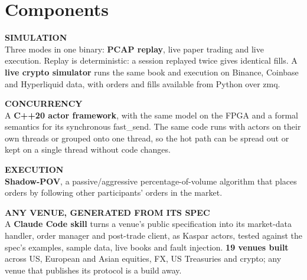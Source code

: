 \documentclass[10pt]{article}
\newcommand{\code}[1]{{\ttfamily\small #1}}
\newcommand{\tile}[2]{%
  {\color{ink3}\sffamily\bfseries\scriptsize\MakeUppercase{#1}}\\[1pt]
  \footnotesize #2\par\vspace{5pt}}
\begin{document}
\section{Components}
\vspace{2pt}

\noindent\begin{minipage}[t]{0.485\textwidth}

\tile{Simulation}{Three modes in one binary: \textbf{PCAP replay}, live
paper trading and live execution. Replay is deterministic: a session replayed
twice gives identical fills. A \textbf{live crypto simulator} runs the same
book and execution on Binance, Coinbase and Hyperliquid data, with orders and
fills available from Python over zmq.}

\tile{Concurrency}{A \textbf{C++20 actor framework}, with the same model on
the FPGA and a formal semantics for its synchronous \code{fast\_send}. The same code runs with actors on their own threads or
grouped onto one thread, so the hot path can be spread out or kept on a single
thread without code changes.}

\tile{Execution}{\textbf{Shadow-POV}, a passive/aggressive percentage-of-volume algorithm
that places orders by following other participants' orders in the market.}

\tile{Any venue, generated from its spec}{A \textbf{Claude Code skill} turns a venue's
public specification into its market-data handler, order manager and post-trade
client, as Kaspar actors, tested against the spec's examples, sample data, live
books and fault injection. \textbf{19 venues built} across US, European and Asian
equities, FX, US Treasuries and crypto; any venue that publishes its protocol is
a build away.}

\end{minipage}\hfill%
\end{document}
